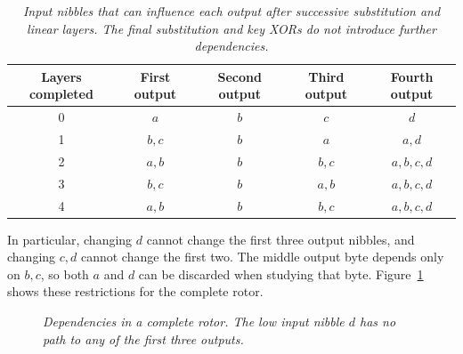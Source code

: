 \documentclass[11pt]{article}
\begin{document}
\begin{table}[htbp]
\centering
\begin{tabular}{ccccc}
\toprule
Layers completed & First output & Second output & Third output & Fourth output\\
\midrule
0 & \(a\) & \(b\) & \(c\) & \(d\)\\
1 & \(b,c\) & \(b\) & \(a\) & \(a,d\)\\
2 & \(a,b\) & \(b\) & \(b,c\) & \(a,b,c,d\)\\
3 & \(b,c\) & \(b\) & \(a,b\) & \(a,b,c,d\)\\
4 & \(a,b\) & \(b\) & \(b,c\) & \(a,b,c,d\)\\
\bottomrule
\end{tabular}
\caption{\textit{Input nibbles that can influence each output after successive
substitution and linear layers. The final substitution and key XORs
do not introduce further dependencies.}}
\label{tab:dependencies}
\end{table}

In particular, changing \(d\) cannot change the first three output
nibbles, and changing \(c,d\) cannot change the first two.
The middle output byte depends only on \(b,c\), so both \(a\) and \(d\)
can be discarded when studying that byte. Figure~\ref{fig:dependencies}
shows these restrictions for the complete rotor.

\begin{figure}[htbp]
\centering
{}
\caption{\textit{Dependencies in a complete rotor.
The low input nibble \(d\) has no path to any of the first three outputs.}}
\label{fig:dependencies}
\end{figure}
\end{document}
